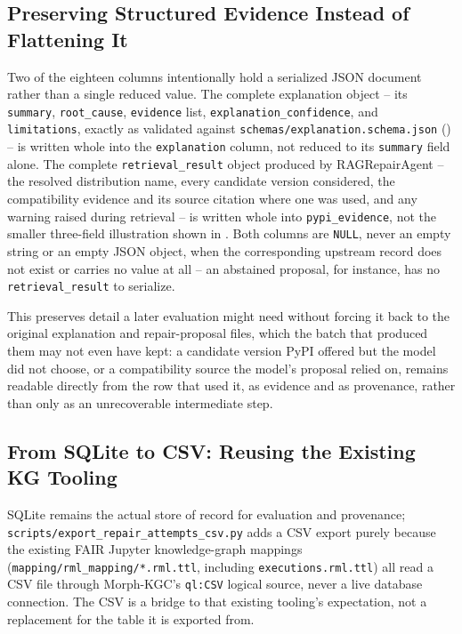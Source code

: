 \subsection{Preserving Structured Evidence Instead of Flattening It}
\label{sec:m-resultlogger-json}

Two of the eighteen columns intentionally hold a serialized JSON document
rather than a single reduced value. The complete explanation object --
its \texttt{summary}, \texttt{root\_cause}, \texttt{evidence} list,
\texttt{explanation\_confidence}, and \texttt{limitations}, exactly as
validated against \texttt{schemas/explanation.schema.json}
() -- is written whole into the
\texttt{explanation} column, not reduced to its \texttt{summary} field
alone. The complete \texttt{retrieval\_result} object produced by
RAGRepairAgent -- the resolved distribution name, every candidate version
considered, the compatibility evidence and its source citation where one
was used, and any warning raised during retrieval -- is written whole into
\texttt{pypi\_evidence}, not the smaller three-field illustration shown in
. Both columns are \texttt{NULL}, never an empty
string or an empty JSON object, when the corresponding upstream record does
not exist or carries no value at all -- an abstained proposal, for
instance, has no \texttt{retrieval\_result} to serialize.

This preserves detail a later evaluation might need without forcing it back
to the original explanation and repair-proposal files, which the batch that
produced them may not even have kept: a candidate version PyPI offered but
the model did not choose, or a compatibility source the model's proposal
relied on, remains readable directly from the row that used it, as evidence
and as provenance, rather than only as an unrecoverable intermediate step.

\subsection{From SQLite to CSV: Reusing the Existing KG Tooling}
\label{sec:m-resultlogger-csv}

SQLite remains the actual store of record for evaluation and provenance;
\texttt{scripts/\allowbreak export\_repair\_attempts\_csv.py} adds a CSV export
purely because the existing FAIR Jupyter knowledge-graph mappings
(\texttt{mapping/rml\_mapping/*.rml.ttl}, including
\texttt{executions.rml.ttl}) all read a CSV file through Morph-KGC's
\texttt{ql:CSV} logical source, never a live database connection. The CSV
is a bridge to that existing tooling's expectation, not a replacement for the
table it is exported from.

